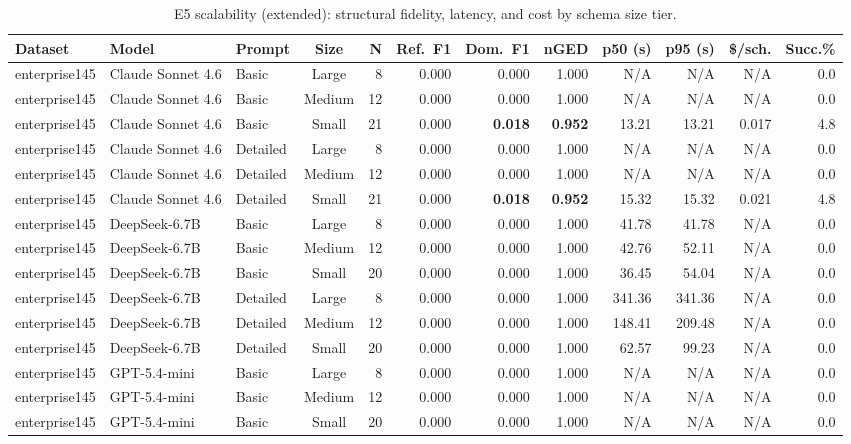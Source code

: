 \begin{table}[t]
\centering
\scriptsize
\caption{E5 scalability (extended): structural fidelity, latency, and cost by schema size tier.}
\label{tab:e5_scalability_ext}
\begin{tabular}{lllcrrrrrrrr}
\toprule
Dataset & Model & Prompt & Size & N & Ref.\ F1 & Dom.\ F1 & nGED & p50 (s) & p95 (s) & \$/sch. & Succ.\% \\
\midrule
enterprise145 & Claude Sonnet 4.6 & Basic & Large & 8 & 0.000 & 0.000 & 1.000 & N/A & N/A & N/A & 0.0 \\
enterprise145 & Claude Sonnet 4.6 & Basic & Medium & 12 & 0.000 & 0.000 & 1.000 & N/A & N/A & N/A & 0.0 \\
enterprise145 & Claude Sonnet 4.6 & Basic & Small & 21 & 0.000 & \textbf{0.018} & \textbf{0.952} & 13.21 & 13.21 & 0.017 & 4.8 \\
enterprise145 & Claude Sonnet 4.6 & Detailed & Large & 8 & 0.000 & 0.000 & 1.000 & N/A & N/A & N/A & 0.0 \\
enterprise145 & Claude Sonnet 4.6 & Detailed & Medium & 12 & 0.000 & 0.000 & 1.000 & N/A & N/A & N/A & 0.0 \\
enterprise145 & Claude Sonnet 4.6 & Detailed & Small & 21 & 0.000 & \textbf{0.018} & \textbf{0.952} & 15.32 & 15.32 & 0.021 & 4.8 \\
enterprise145 & DeepSeek-6.7B & Basic & Large & 8 & 0.000 & 0.000 & 1.000 & 41.78 & 41.78 & N/A & 0.0 \\
enterprise145 & DeepSeek-6.7B & Basic & Medium & 12 & 0.000 & 0.000 & 1.000 & 42.76 & 52.11 & N/A & 0.0 \\
enterprise145 & DeepSeek-6.7B & Basic & Small & 20 & 0.000 & 0.000 & 1.000 & 36.45 & 54.04 & N/A & 0.0 \\
enterprise145 & DeepSeek-6.7B & Detailed & Large & 8 & 0.000 & 0.000 & 1.000 & 341.36 & 341.36 & N/A & 0.0 \\
enterprise145 & DeepSeek-6.7B & Detailed & Medium & 12 & 0.000 & 0.000 & 1.000 & 148.41 & 209.48 & N/A & 0.0 \\
enterprise145 & DeepSeek-6.7B & Detailed & Small & 20 & 0.000 & 0.000 & 1.000 & 62.57 & 99.23 & N/A & 0.0 \\
enterprise145 & GPT-5.4-mini & Basic & Large & 8 & 0.000 & 0.000 & 1.000 & N/A & N/A & N/A & 0.0 \\
enterprise145 & GPT-5.4-mini & Basic & Medium & 12 & 0.000 & 0.000 & 1.000 & N/A & N/A & N/A & 0.0 \\
enterprise145 & GPT-5.4-mini & Basic & Small & 20 & 0.000 & 0.000 & 1.000 & N/A & N/A & N/A & 0.0 \\

\end{tabular}
\end{table}
